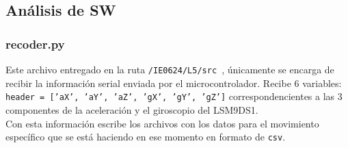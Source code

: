 \subsection{Análisis de SW}
\subsubsection{recoder.py}
Este archivo entregado en la ruta \texttt{/IE0624/L5/src
}, únicamente se encarga de recibir la información serial enviada por el microcontrolador. Recibe 6 variables: \texttt{header = ['aX', 'aY', 'aZ', 'gX', 'gY', 'gZ']} correspondencientes a las 3 componentes de la aceleración y el giroscopio del LSM9DS1.\\
Con esta información escribe los archivos con los datos para el movimiento específico que se está haciendo en ese momento en formato de \texttt{csv}. 
